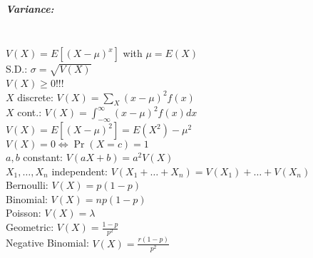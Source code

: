 \documentclass[landscape,10pt]{article}
\begin{document}
\begin{multicols}{4}
\subparagraph*{Variance: } \ \ \\
\(V(X) = E[(X-\mu)^x]\) with \(\mu = E(X)\) \\
S.D.: \(\sigma = \sqrt{V(X)}\) \\ 
\(V(X) \geq 0\)!!! \\ 
\(X\) discrete: \(V(X) = \sum\limits_X{(x-\mu)^2f(x)}\) \\ 
\(X\) cont.: \(V(X) = \int_{-\infty}^{\infty}{(x-\mu)^2f(x)dx}\) \\ 
\(V(X) = E[(X-\mu)^2] = E(X^2) - \mu^2\) \\ 
\(V(X) = 0 \iff \Pr(X = c) = 1\) \\
\(a, b\) constant: \(V(aX+b) = a^2V(X)\) \\ 
\(X_1,\ldots,X_n\) independent: \(V(X_1+\ldots+X_n) = V(X_1)+ \ldots + V(X_n)\) \\
Bernoulli: \(V(X) = p(1-p)\) \\ 
Binomial: \(V(X) = np(1-p)\) \\
Poisson: \(V(X) = \lambda\) \\
Geometric: \(V(X) = \frac{1-p}{p^2}\) \\
Negative Binomial: \(V(X) = \frac{r(1-p)}{p^2}\) 



\end{multicols}
\end{document}
